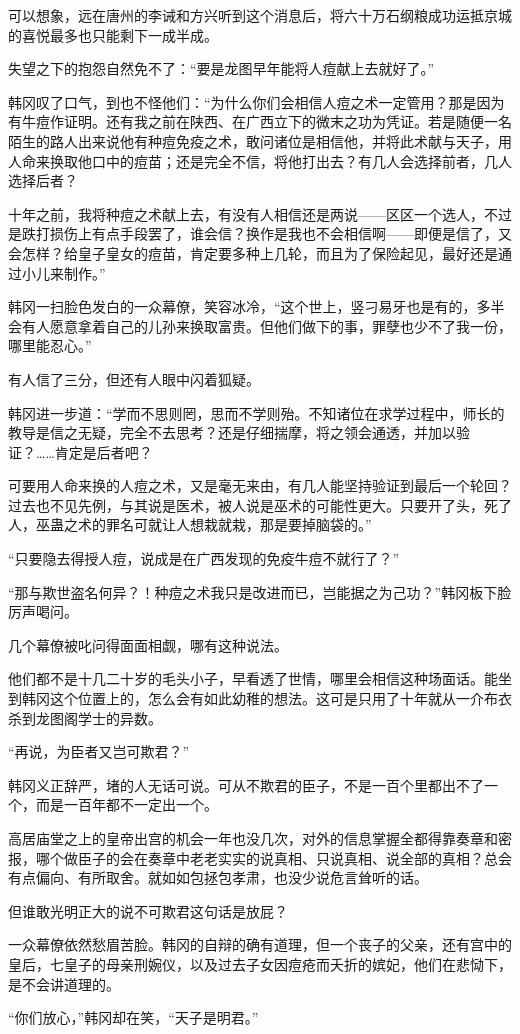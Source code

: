 可以想象，远在唐州的李诫和方兴听到这个消息后，将六十万石纲粮成功运抵京城的喜悦最多也只能剩下一成半成。

失望之下的抱怨自然免不了：“要是龙图早年能将人痘献上去就好了。”

韩冈叹了口气，到也不怪他们：“为什么你们会相信人痘之术一定管用？那是因为有牛痘作证明。还有我之前在陕西、在广西立下的微末之功为凭证。若是随便一名陌生的路人出来说他有种痘免疫之术，敢问诸位是相信他，并将此术献与天子，用人命来换取他口中的痘苗；还是完全不信，将他打出去？有几人会选择前者，几人选择后者？

十年之前，我将种痘之术献上去，有没有人相信还是两说——区区一个选人，不过是跌打损伤上有点手段罢了，谁会信？换作是我也不会相信啊——即便是信了，又会怎样？给皇子皇女的痘苗，肯定要多种上几轮，而且为了保险起见，最好还是通过小儿来制作。”

韩冈一扫脸色发白的一众幕僚，笑容冰冷，“这个世上，竖刁易牙也是有的，多半会有人愿意拿着自己的儿孙来换取富贵。但他们做下的事，罪孽也少不了我一份，哪里能忍心。”

有人信了三分，但还有人眼中闪着狐疑。

韩冈进一步道：“学而不思则罔，思而不学则殆。不知诸位在求学过程中，师长的教导是信之无疑，完全不去思考？还是仔细揣摩，将之领会通透，并加以验证？……肯定是后者吧？

可要用人命来换的人痘之术，又是毫无来由，有几人能坚持验证到最后一个轮回？过去也不见先例，与其说是医术，被人说是巫术的可能性更大。只要开了头，死了人，巫蛊之术的罪名可就让人想栽就栽，那是要掉脑袋的。”

“只要隐去得授人痘，说成是在广西发现的免疫牛痘不就行了？”

“那与欺世盗名何异？！种痘之术我只是改进而已，岂能据之为己功？”韩冈板下脸厉声喝问。

几个幕僚被叱问得面面相觑，哪有这种说法。

他们都不是十几二十岁的毛头小子，早看透了世情，哪里会相信这种场面话。能坐到韩冈这个位置上的，怎么会有如此幼稚的想法。这可是只用了十年就从一介布衣杀到龙图阁学士的异数。

“再说，为臣者又岂可欺君？”

韩冈义正辞严，堵的人无话可说。可从不欺君的臣子，不是一百个里都出不了一个，而是一百年都不一定出一个。

高居庙堂之上的皇帝出宫的机会一年也没几次，对外的信息掌握全都得靠奏章和密报，哪个做臣子的会在奏章中老老实实的说真相、只说真相、说全部的真相？总会有点偏向、有所取舍。就如如包拯包孝肃，也没少说危言耸听的话。

但谁敢光明正大的说不可欺君这句话是放屁？

一众幕僚依然愁眉苦脸。韩冈的自辩的确有道理，但一个丧子的父亲，还有宫中的皇后，七皇子的母亲刑婉仪，以及过去子女因痘疮而夭折的嫔妃，他们在悲恸下，是不会讲道理的。

“你们放心，”韩冈却在笑，“天子是明君。”

